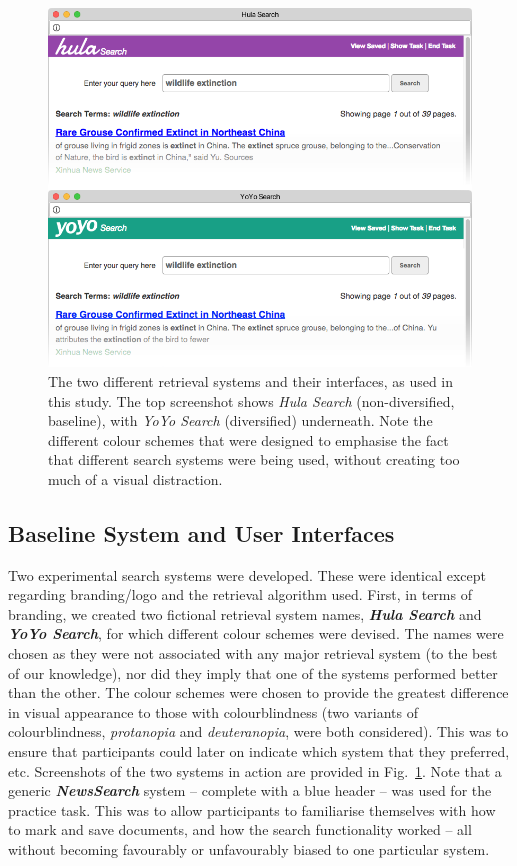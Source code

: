 \begin{figure}[t!]
\includegraphics[width=1.0\columnwidth]{figures/interface-both.png}
\caption{The two different retrieval systems and their interfaces, as used in this study. The top screenshot shows \emph{Hula Search} (non-diversified, baseline), with \emph{YoYo Search} (diversified) underneath. Note the different colour schemes that were designed to emphasise the fact that different search systems were being used, without creating too much of a visual distraction.
} 
\label{fig_systems}
\end{figure}

\subsection{Baseline System and User Interfaces}\label{sec:method:systems}
Two experimental search systems were developed. These were identical except regarding branding/logo and the retrieval algorithm used. First, in terms of branding, we created two fictional retrieval system names,
\textbf{\emph{Hula Search}} and \textbf{\emph{YoYo Search}}, for which different colour schemes were devised. The names were chosen as they were not associated with any major retrieval system (to the best of our knowledge), nor did they imply that one of the systems performed better than the other. The colour schemes were chosen to provide the greatest difference in visual appearance to those with colourblindness (two variants of colourblindness, \emph{protanopia} and \emph{deuteranopia}, were both considered). This was to ensure that participants could later on indicate which system that they preferred, etc. Screenshots of the two systems in action are provided in Fig.~\ref{fig_systems}. 
Note that a generic \textbf{\emph{NewsSearch}} system -- complete with a blue header -- was used for the practice task. This was to allow participants to familiarise themselves with how to mark and save documents, and how the search functionality worked -- all without becoming favourably or unfavourably biased to one particular system.

